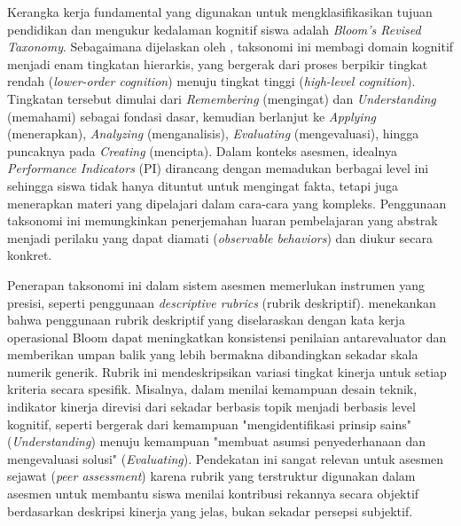 Kerangka kerja fundamental yang digunakan untuk mengklasifikasikan tujuan pendidikan dan mengukur kedalaman kognitif siswa adalah \textit{Bloom's Revised Taxonomy}. Sebagaimana dijelaskan oleh \textcite{Gosselin2018}, taksonomi ini membagi domain kognitif menjadi enam tingkatan hierarkis, yang bergerak dari proses berpikir tingkat rendah (\textit{lower-order cognition}) menuju tingkat tinggi (\textit{high-level cognition}). Tingkatan tersebut dimulai dari \textit{Remembering} (mengingat) dan \textit{Understanding} (memahami) sebagai fondasi dasar, kemudian berlanjut ke \textit{Applying} (menerapkan), \textit{Analyzing} (menganalisis), \textit{Evaluating} (mengevaluasi), hingga puncaknya pada \textit{Creating} (mencipta). Dalam konteks asesmen, idealnya \textit{Performance Indicators} (PI) dirancang dengan memadukan berbagai level ini sehingga siswa tidak hanya dituntut untuk mengingat fakta, tetapi juga menerapkan materi yang dipelajari dalam cara-cara yang kompleks. Penggunaan taksonomi ini memungkinkan penerjemahan luaran pembelajaran yang abstrak menjadi perilaku yang dapat diamati (\textit{observable behaviors}) dan diukur secara konkret.

Penerapan taksonomi ini dalam sistem asesmen memerlukan instrumen yang presisi, seperti penggunaan \textit{descriptive rubrics} (rubrik deskriptif). \textcite{Gosselin2018} menekankan bahwa penggunaan rubrik deskriptif yang diselaraskan dengan kata kerja operasional Bloom dapat meningkatkan konsistensi penilaian antarevaluator dan memberikan umpan balik yang lebih bermakna dibandingkan sekadar skala numerik generik. Rubrik ini mendeskripsikan variasi tingkat kinerja untuk setiap kriteria secara spesifik. Misalnya, dalam menilai kemampuan desain teknik, indikator kinerja direvisi dari sekadar berbasis topik menjadi berbasis level kognitif, seperti bergerak dari kemampuan "mengidentifikasi prinsip sains" (\textit{Understanding}) menuju kemampuan "membuat asumsi penyederhanaan dan mengevaluasi solusi" (\textit{Evaluating}). Pendekatan ini sangat relevan untuk asesmen sejawat (\textit{peer assessment}) karena rubrik yang terstruktur digunakan dalam asesmen untuk membantu siswa menilai kontribusi rekannya secara objektif berdasarkan deskripsi kinerja yang jelas, bukan sekadar persepsi subjektif.


